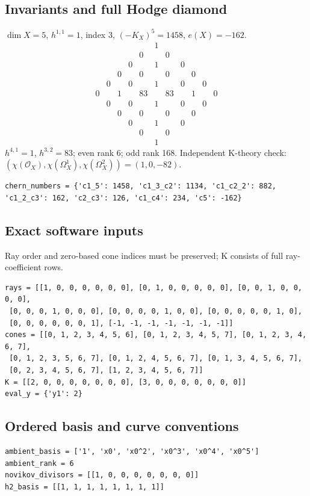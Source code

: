 \documentclass[10pt,a4paper]{article}
\begin{document}
\subsection*{Invariants and full Hodge diamond}
$\dim X=5$, $h^{1,1}=1$, index $3$, $(-K_X)^5=1458$, $e(X)=-162$.
\[\begin{array}{ccccccccccc}&&&&&1&&&&&\\&&&&0&&0&&&&\\&&&0&&1&&0&&&\\&&0&&0&&0&&0&&\\&0&&0&&1&&0&&0&\\0&&1&&83&&83&&1&&0\\&0&&0&&1&&0&&0&\\&&0&&0&&0&&0&&\\&&&0&&1&&0&&&\\&&&&0&&0&&&&\\&&&&&1&&&&&\end{array}\]
$h^{4,1}=1$, $h^{3,2}=83$; even rank 6; odd rank 168.
Independent K-theory check: $(\chi(\mathcal O_X),\chi(\Omega_X^1),\chi(\Omega_X^2))=(1, 0, -82)$.
\begin{lstlisting}
chern_numbers = {'c1_5': 1458, 'c1_3_c2': 1134, 'c1_c2_2': 882, 'c1_2_c3': 162, 'c2_c3': 126, 'c1_c4': 234, 'c5': -162}
\end{lstlisting}
\subsection*{Exact software inputs}
Ray order and zero-based cone indices must be preserved; K consists of full ray-coefficient rows.
\begin{lstlisting}
rays = [[1, 0, 0, 0, 0, 0, 0], [0, 1, 0, 0, 0, 0, 0], [0, 0, 1, 0, 0, 0, 0],
 [0, 0, 0, 1, 0, 0, 0], [0, 0, 0, 0, 1, 0, 0], [0, 0, 0, 0, 0, 1, 0],
 [0, 0, 0, 0, 0, 0, 1], [-1, -1, -1, -1, -1, -1, -1]]
cones = [[0, 1, 2, 3, 4, 5, 6], [0, 1, 2, 3, 4, 5, 7], [0, 1, 2, 3, 4, 6, 7],
 [0, 1, 2, 3, 5, 6, 7], [0, 1, 2, 4, 5, 6, 7], [0, 1, 3, 4, 5, 6, 7],
 [0, 2, 3, 4, 5, 6, 7], [1, 2, 3, 4, 5, 6, 7]]
K = [[2, 0, 0, 0, 0, 0, 0, 0], [3, 0, 0, 0, 0, 0, 0, 0]]
eval_y = {'y1': 2}
\end{lstlisting}
\subsection*{Ordered basis and curve conventions}
\begin{lstlisting}
ambient_basis = ['1', 'x0', 'x0^2', 'x0^3', 'x0^4', 'x0^5']
ambient_rank = 6
novikov_divisors = [[1, 0, 0, 0, 0, 0, 0, 0]]
h2_basis = [[1, 1, 1, 1, 1, 1, 1, 1]]
\end{lstlisting}
\end{document}
